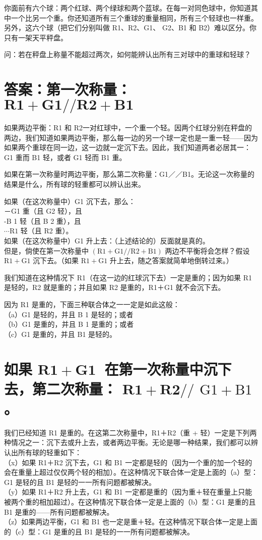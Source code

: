 你面前有六个球：两个红球、两个绿球和两个蓝球。在每一对同色球中，你知道其中一个比另一个重。你还知道所有三个重球的重量相同，所有三个轻球也一样重。另外，这六个球（把它们分别叫做 R1、R2、G1、 G2、B1 和 B2）难以区分。你只有一架天平秤盘。

问：若在秤盘上称量不能超过两次，如何能辨认出所有三对球中的重球和轻球？

\section*{答案：第一次称量： $\mathbf{R 1 + G 1 / / R 2 + B 1}$}
如果两边平衡：R1 和 R2一对红球中，一个重一个轻。因两个红球分别在秤盘的两边，我们知道如果两边平衡，那么每一边的另一个球一定也是一重一轻——因为如果两个重球在同一边，这一边就一定沉下去。因此，我们知道两者必居其一：G1 重而 B1 轻，或者 G1 轻而 B1 重。

如果在第一次称量时两边平衡，那么第二次称量：G1／／B1。无论这一次称量的结果是什么，所有球的轻重都可以辨认出来。

如果（在这次称量中）G1 沉下去，那么：\\
－G1 重（且 G2 轻），且\\
-B 1 轻（且 B 2 重），且\\
$\cdots \mathrm{R} 1$ 轻（且 R2 重）。\\
如果（在这次称量中）G1 升上去：（上述结论的）反面就是真的。\\
但是，倘使在第一次称量中 $(\mathrm{R} 1+\mathrm{G} 1 / / \mathrm{R} 2+\mathrm{B} 1)$ 两边不平衡将会怎样？假设 $\mathrm{R} 1+\mathrm{G} 1$ 沉下去。（如果 $\mathrm{R} 1+\mathrm{G} 1$ 升上去，随之答案就简单地倒转过来。）

我们知道在这种情况下 R1（在这一边的红球沉下去）一定是重的；因为如果 R1 是轻的，R2 就是重的；并且如果 R2 是重的，R1＋G1 就不会沉下去。

因为 R1 是重的，下面三种联合体之一一定是如此这般：\\
（a）G1 是轻的，并且 B 1 是轻的；或者\\
（b）G1 是重的，并且 B 1 是重的；或者\\
（c）G1 是重的，并且 B1 是轻的。

\section*{如果 $\mathbf{R 1 + G 1 ~}$ 在第一次称量中沉下去，第二次称量： $\mathbf{R 1 + R 2 / /}$ $\mathrm{G} 1+\mathrm{B} 1$ 。}
我们已经知道 R1 是重的。在这第二次称量中，R1＋R2（重 + 轻）一定是下列两种情况之一：沉下去或升上去，或者两边平衡。无论是哪一种结果，我们都可以辨认出所有球的轻重如下：\\
（x）如果 R1＋R2 沉下去，G1 和 B1 一定都是轻的（因为一个重的加一个轻的会在重量上超过仅仅两个轻的相加）。在这种情况下联合体一定是上面的（a）型：G1 是轻的且 B1 是轻的一一所有问题都被解决。\\
（y）如果 R1＋R2 升上去，G1 和 B1 一定都是重的（因为重＋轻在重量上只能被两个重的相加超过）。在这种情况下联合体一定是上面的（b）型：G1 是重的且 B1 是重的——所有问题都被解决。\\
（z）如果两边平衡，G1 和 B1 也一定是重＋轻。在这种情况下联合体一定是上面的（c）型：G1 是重的且 B1 是轻的一一所有问题都被解决。

